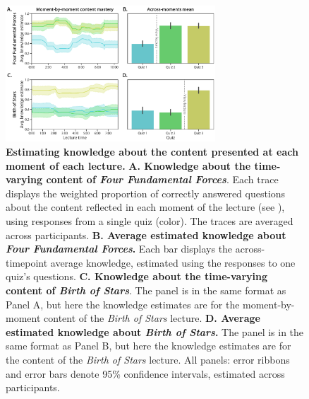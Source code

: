 \documentclass[10pt]{article}
\renewcommand{\nameref}[1]{\mbox{\textit{\oldnameref{#1}}}}
\begin{document}
\begin{figure}[tp]
    \centering
    \includegraphics[width=0.7\textwidth]{figs/content-mastery}

    \caption{\textbf{Estimating knowledge about the content presented at each
    moment of each lecture.} \textbf{A. Knowledge about the time-varying
    content of \textit{Four Fundamental Forces}}. Each trace displays the
    weighted proportion of correctly answered questions about the content
    reflected in each moment of the lecture (see \nameref{subsec:traces}),
    using responses from a single quiz (color). The traces are averaged across
    participants. \textbf{B. Average estimated knowledge about \textit{Four
    Fundamental Forces}.} Each bar displays the across-timepoint average
    knowledge, estimated using the responses to one quiz's questions.
    \textbf{C. Knowledge about the time-varying content of \textit{Birth of
    Stars}}. The panel is in the same format as Panel A, but here the knowledge
    estimates are for the moment-by-moment content of the \textit{Birth of
    Stars} lecture. \textbf{D. Average estimated knowledge about \textit{Birth
    of Stars}.} The panel is in the same format as Panel B, but here the
    knowledge estimates are for the content of the \textit{Birth of Stars}
    lecture. All panels: error ribbons and error bars denote 95\% confidence
    intervals, estimated across participants.}

    \label{fig:knowledge-timeseries}
\end{figure}
\end{document}
